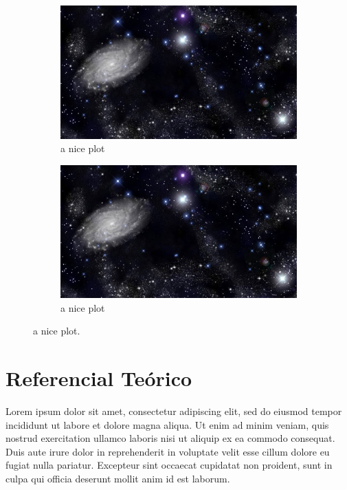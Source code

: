 \documentclass[10pt, a4paper,twocolumn]{article}
\begin{document}
\begin{figure}[h]
\begin{subfigure}{0.23\textwidth}
\includegraphics[width=1.0\linewidth]{imgs/universe.jpg} 
\caption{a nice plot}
\label{fig:subim1}
\end{subfigure}
\begin{subfigure}{0.23\textwidth}
\includegraphics[width=1.0\linewidth]{imgs/universe.jpg}
\caption{a nice plot}
\label{fig:subim2}
\end{subfigure}
\caption{a nice plot.}
\label{fig:image2}
\end{figure}

\section{Referencial Teórico}
Lorem ipsum dolor sit amet, consectetur adipiscing elit, sed do eiusmod tempor incididunt ut labore et dolore magna aliqua. Ut enim ad minim veniam, quis nostrud exercitation ullamco laboris nisi ut aliquip ex ea commodo consequat. Duis aute irure dolor in reprehenderit in voluptate velit esse cillum dolore eu fugiat nulla pariatur. Excepteur sint occaecat cupidatat non proident, sunt in culpa qui officia deserunt mollit anim id est laborum.
\end{document}
